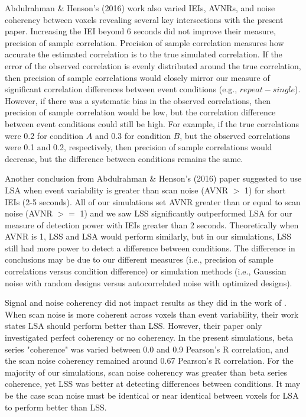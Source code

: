\documentclass[phd,appendix,figures]{uithesis}
\begin{document}
Abdulrahman \& Henson's (2016) work also varied IEIs, AVNRs, and noise coherency between voxels
revealing several key intersections with the present paper.
Increasing the IEI beyond 6 seconds did not improve their measure, precision of sample correlation.
Precision of sample correlation measures how accurate the estimated correlation is to the true
simulated correlation.
If the error of the observed correlation is evenly distributed around the
true correlation, then precision of sample correlations would closely mirror our measure of
significant correlation differences between event conditions (e.g., $repeat - single$).
However, if there was a systematic bias in the observed correlations, then precision of sample correlation
would be low, but the correlation difference between event conditions could still be high.
For example, if the true correlations were 0.2 for condition $A$ and 0.3 for condition $B$, but
the observed correlations were 0.1 and 0.2, respectively, then precision of sample correlations would
decrease, but the difference between conditions remains the same.

Another conclusion from Abdulrahman \& Henson's (2016) paper suggested to
use LSA when event variability is greater than scan noise (AVNR $>$ 1) for short IEIs (2-5 seconds).
All of our simulations set AVNR greater than or equal to scan noise (AVNR $>=$ 1) and we saw
LSS significantly outperformed LSA for our measure of detection power with IEIs greater than 2 seconds.
Theoretically when AVNR is 1, LSS and LSA would perform similarly, but in our simulations,
LSS still had more power to detect a difference between conditions.
The difference in conclusions may be due to our different measures (i.e., precision of sample correlations versus condition difference)
or simulation methods (i.e., Gaussian noise with random designs versus autocorrelated noise with optimized designs).

Signal and noise coherency did not impact results as they did in the work of \cite[Abdulrahman \& Henson (2016)]{Abdulrahman2016}.
When scan noise is more coherent across voxels than event variability,
their work states LSA should perform better than LSS.
However, their paper only investigated perfect coherency or no coherency.
In the present simulations, beta series "coherence" was varied between 0.0 and 0.9 Pearson's R correlation,
and the scan noise coherency remained around 0.67 Pearson's R correlation.
For the majority of our simulations, scan noise coherency was greater than beta series
coherence, yet LSS was better at detecting differences between conditions.
It may be the case scan noise must be identical or near identical between voxels
for LSA to perform better than LSS.
\end{document}
